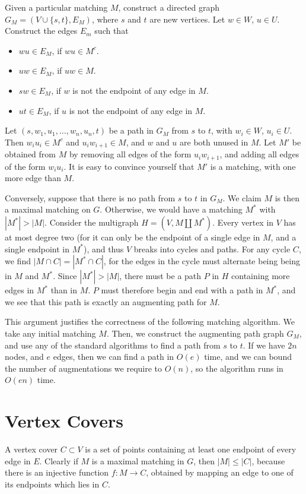 Given a particular matching $M$, construct a directed graph $G_M = (V \cup \{ s, t \},E_M)$, where $s$ and $t$ are new vertices. Let $w \in W$, $u \in U$. Construct the edges $E_m$ such that
%
\begin{itemize}
    \item $wu \in E_M$, if $wu \in M^c$.
    \item $uw \in E_M$, if $uw \in M$.
    \item $sw \in E_M$, if $w$ is not the endpoint of any edge in $M$.
    \item $ut \in E_M$, if $u$ is not the endpoint of any edge in $M$.
\end{itemize}
%
Let $(s,w_1,u_1,\dots,w_n,u_n,t)$ be a path in $G_M$ from $s$ to $t$, with $w_i \in W$, $u_i \in U$. Then $w_i u_i \in M^c$ and $u_iw_{i+1} \in M$, and $w$ and $u$ are both unused in $M$. Let $M'$ be obtained from $M$ by removing all edges of the form $u_iw_{i+1}$, and adding all edges of the form $w_i u_i$. It is easy to convince yourself that $M'$ is a matching, with one more edge than $M$.

Conversely, suppose that there is no path from $s$ to $t$ in $G_M$. We claim $M$ is then a maximal matching on $G$. Otherwise, we would have a matching $M^*$ with $|M^*| > |M|$. Consider the multigraph $H = (V, M \amalg M^*)$. Every vertex in $V$ has at most degree two (for it can only be the endpoint of a single edge in $M$, and a single endpoint in $M^*$), and thus $V$ breaks into cycles and paths. For any cycle $C$, we find $|M \cap C| = |M^* \cap C|$, for the edges in the cycle must alternate being being in $M$ and $M^*$. Since $|M^*| > |M|$, there must be a path $P$ in $H$ containing more edges in $M^*$ than in $M$. $P$ must therefore begin and end with a path in $M^*$, and we see that this path is exactly an augmenting path for $M$.

This argument justifies the correctness of the following matching algorithm. We take any initial matching $M$. Then, we construct the augmenting path graph $G_M$, and use any of the standard algorithms to find a path from $s$ to $t$. If we have $2n$ nodes, and $e$ edges, then we can find a path in $O(e)$ time, and we can bound the number of augmentations we require to $O(n)$, so the algorithm runs in $O(en)$ time.

\section{Vertex Covers}

A vertex cover $C \subset V$ is a set of points containing at least one endpoint of every edge in $E$. Clearly if $M$ is a maximal matching in $G$, then $|M| \leq |C|$, because there is an injective function $f:M \to C$, obtained by mapping an edge to one of its endpoints which lies in $C$.

